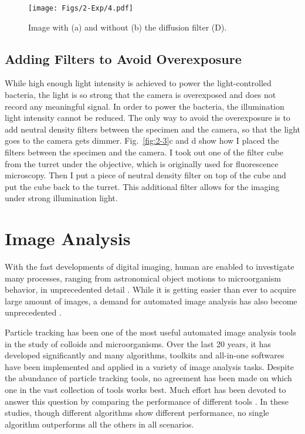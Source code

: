 \begin{figure}[!]
	\begin{center}
	\texttt{[image: Figs/2-Exp/4.pdf]}
	\end{center}
	\caption[Diffusion filter function illustration]
	{
	Image with (a) and without (b) the diffusion filter (D).
	}
	\label{fig:2-4}
\end{figure}

\subsection{Adding Filters to Avoid Overexposure}

While high enough light intensity is achieved to power the light-controlled bacteria, the light is so strong that the camera is overexposed and does not record any meaningful signal. In order to power the bacteria, the illumination light intensity cannot be reduced. The only way to avoid the overexposure is to add neutral density filters between the specimen and the camera, so that the light goes to the camera gets dimmer. Fig.~\ref{fig:2-3}c and d show how I placed the filters between the specimen and the camera. I took out one of the filter cube from the turret under the objective, which is originally used for fluorescence microscopy. Then I put a piece of neutral density filter on top of the cube and put the cube back to the turret. This additional filter allows for the imaging under strong illumination light.

\section{Image Analysis}
\label{sec:image-analysis}
With the fast developments of digital imaging, human are enabled to investigate many processes, ranging from astronomical object motions to microorganism behavior, in unprecedented detail \cite{Kalaidzidis2007}. While it is getting easier than ever to acquire large amount of images, a demand for automated image analysis has also become unprecedented \cite{Meijering2006, Jaqaman2008, Rohr2010}.

Particle tracking has been one of the most useful automated image analysis tools in the study of colloids and microorganisms. Over the last 20 years, it has developed significantly and many algorithms, toolkits and all-in-one softwares have been implemented and applied in a variety of image analysis tasks. Despite the abundance of particle tracking tools, no agreement has been made on which one in the vast collection of tools works best. Much effort has been devoted to answer this question by comparing the performance of different tools \cite{Kalaidzidis2007, Dorn2008, Meijering2009, Smal2010, Meijering2012,
Chenouard2014, Maska2014, Hilsenbeck2016}. In these studies, though different algorithms show different performance, no single algorithm outperforms all the others in all scenarios.

